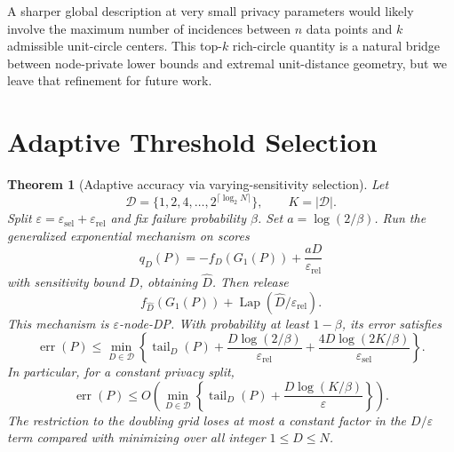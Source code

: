 \documentclass[11pt]{article}
\newtheorem{theorem}{Theorem}[section]
\DeclareMathOperator{\Lap}{Lap}
\newcommand{\eps}{\varepsilon}
\newcommand{\calD}{\mathcal{D}}
\newcommand{\tail}{\operatorname{tail}}
\begin{document}
A sharper global description at very small privacy parameters would likely involve the maximum number of incidences between \(n\) data points and \(k\) admissible unit-circle centers. This top-\(k\) rich-circle quantity is a natural bridge between node-private lower bounds and extremal unit-distance geometry, but we leave that refinement for future work.


\section{Adaptive Threshold Selection}
\label{sec:adaptive-selection}

\begin{theorem}[Adaptive accuracy via varying-sensitivity selection]
\label{thm:adaptive}
Let
\[
\calD=\{1,2,4,\ldots,2^{\lceil\log_2 N\rceil}\},\qquad K=|\calD|.
\]
Split \(\eps=\eps_{\mathrm{sel}}+\eps_{\mathrm{rel}}\) and fix failure probability \(\beta\). Set \(a=\log(2/\beta)\). Run the generalized exponential mechanism on scores
\[
q_D(P)=-f_D(G_1(P))+\frac{aD}{\eps_{\mathrm{rel}}}
\]
with sensitivity bound \(D\), obtaining \(\widehat D\). Then release
\[
f_{\widehat D}(G_1(P))+\Lap(\widehat D/\eps_{\mathrm{rel}}).
\]
This mechanism is \(\eps\)-node-DP. With probability at least \(1-\beta\), its error satisfies
\[
\operatorname{err}(P)\le
\min_{D\in \calD}
\left\{
\tail_D(P)+\frac{D\log(2/\beta)}{\eps_{\mathrm{rel}}}
+\frac{4D\log(2K/\beta)}{\eps_{\mathrm{sel}}}
\right\}.
\]
In particular, for a constant privacy split,
\[
\operatorname{err}(P)\le
O\!\left(\min_{D\in\calD}\left\{\tail_D(P)+\frac{D\log(K/\beta)}{\eps}\right\}\right).
\]
The restriction to the doubling grid loses at most a constant factor in the \(D/\eps\) term compared with minimizing over all integer \(1\le D\le N\).
\end{theorem}
\end{document}
